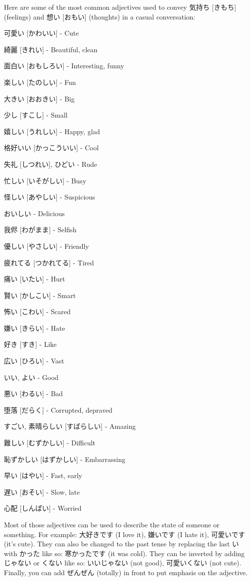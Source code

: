 \documentclass{article}
\begin{document}
\begin{CJK}{UTF8}{min}
\begin{multicols*}{3}
Here are some of the most common adjectives used to convey 気持ち [きもち] (feelings) and 想い [おもい] (thoughts) in a casual conversation:

\begin{colorize}
\item 可愛い [かわいい] - Cute
\item 綺麗 [きれい] - Beautiful, clean
\item 面白い [おもしろい] - Interesting, funny
\item 楽しい [たのしい] - Fun
\item 大きい [おおきい] - Big
\item 少し [すこし] - Small
\item 嬉しい [うれしい] - Happy, glad
\item 格好いい [かっこういい] - Cool
\item 失礼 [しつれい], ひどい - Rude
\item 忙しい [いそがしい] - Busy
\item 怪しい [あやしい] - Suspicious
\item おいしい - Delicious
\item 我侭 [わがまま] - Selfish
\item 優しい [やさしい] - Friendly
\item 疲れてる [つかれてる] - Tired
\item 痛い [いたい] - Hurt
\item 賢い [かしこい] - Smart
\item 怖い [こわい] - Scared
\item 嫌い [きらい] - Hate
\item 好き [すき] - Like
\item 広い [ひろい] - Vast
\item いい, よい - Good
\item 悪い [わるい] - Bad
\item 堕落 [だらく] - Corrupted, depraved
\item すごい, 素晴らしい [すばらしい] - Amazing
\item 難しい [むずかしい] - Difficult
\item 恥ずかしい [はずかしい] - Embarrassing
\item 早い [はやい] - Fast, early
\item 遅い [おそい] - Slow, late
\item 心配 [しんぱい] - Worried
\end{colorize}

Most of those adjectives can be used to describe the state of someone or something. For example: 大好きです (I love it), 嫌いです (I hate it), 可愛いです (it's cute). They can also 
be changed to the past tense by replacing the last い with かった like so: 寒かったです (it was cold). They can be inverted by adding じゃない or くない like so: 
いいじゃない (not good), 可愛いくない (not cute). Finally, you can add ぜんぜん (totally) in front to put emphasis on the adjective.


\end{multicols*}
\end{CJK}
\end{document}
